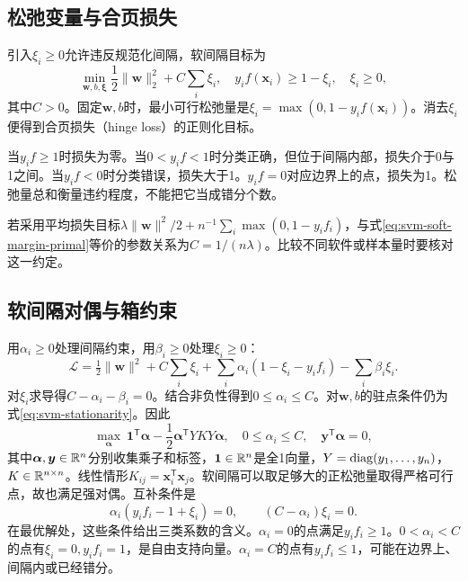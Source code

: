 \subsection{松弛变量与合页损失}
引入$\xi_i\ge0$允许违反规范化间隔，软间隔目标为
\begin{equation}
 \min_{\bm w,b,\bm\xi}\frac12\|\bm w\|_2^2+C\sum_i\xi_i,
 \quad y_if(\bm x_i)\ge1-\xi_i,\quad\xi_i\ge0,
 \label{eq:svm-soft-margin-primal}
\end{equation}
其中$C>0$。固定$\bm w,b$时，最小可行松弛量是$\xi_i=\max(0,1-y_if(\bm x_i))$。消去$\xi_i$便得到合页损失（hinge loss）的正则化目标。

当$y_if\ge1$时损失为零。当$0<y_if<1$时分类正确，但位于间隔内部，损失介于0与1之间。当$y_if<0$时分类错误，损失大于1。$y_if=0$对应边界上的点，损失为1。松弛量总和衡量违约程度，不能把它当成错分个数。

若采用平均损失目标$\lambda\|\bm w\|^2/2+n^{-1}\sum_i\max(0,1-y_if_i)$，与式\eqref{eq:svm-soft-margin-primal}等价的参数关系为$C=1/(n\lambda)$。比较不同软件或样本量时要核对这一约定。

\subsection{软间隔对偶与箱约束}
用$\alpha_i\ge0$处理间隔约束，用$\beta_i\ge0$处理$\xi_i\ge0$：
\begin{equation}
 \mathcal L=\tfrac12\|\bm w\|^2+C\sum_i\xi_i
 +\sum_i\alpha_i(1-\xi_i-y_if_i)-\sum_i\beta_i\xi_i.
\end{equation}
对$\xi_i$求导得$C-\alpha_i-\beta_i=0$。结合非负性得到$0\le\alpha_i\le C$。对$\bm w,b$的驻点条件仍为式\eqref{eq:svm-stationarity}。因此
\begin{equation}
 \max_{\bm\alpha}\ \bm1^{\mathsf T}\bm\alpha-\frac12\bm\alpha^{\mathsf T}YKY\bm\alpha,
 \quad 0\le\alpha_i\le C,\quad \bm y^{\mathsf T}\bm\alpha=0,
 \label{eq:svm-dual}
\end{equation}
其中$\bm\alpha,\bm y\in\mathbb{R}^n$分别收集乘子和标签，$\bm1\in\mathbb{R}^n$是全1向量，$Y=\operatorname{diag}(y_1,\ldots,y_n)$，$K\in\mathbb{R}^{n\times n}$。线性情形$K_{ij}=\bm x_i^{\mathsf T}\bm x_j$。软间隔可以取足够大的正松弛量取得严格可行点，故也满足强对偶。互补条件是
\begin{equation}
 \alpha_i(y_if_i-1+\xi_i)=0,\qquad (C-\alpha_i)\xi_i=0.
\end{equation}
在最优解处，这些条件给出三类系数的含义。$\alpha_i=0$的点满足$y_if_i\ge1$。$0<\alpha_i<C$的点有$\xi_i=0,y_if_i=1$，是自由支持向量。$\alpha_i=C$的点有$y_if_i\le1$，可能在边界上、间隔内或已经错分。

